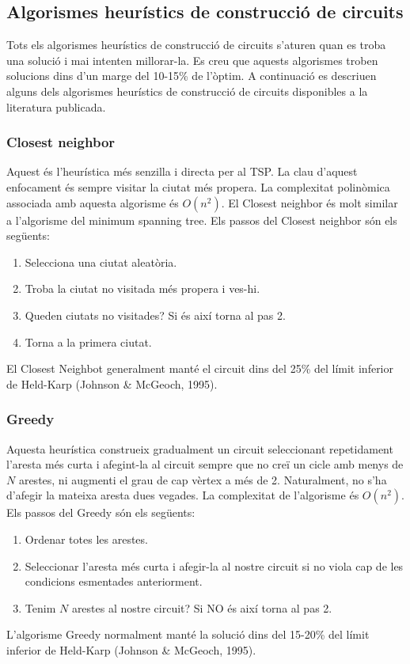 \documentclass[a4paper,12pt,twoside]{ThesisStyle}
\begin{document}
\subsection{Algorismes heurístics de construcció de circuits}
\label{AlgorismesHeuristicsConstruccio}
Tots els algorismes heurístics de construcció de circuits s'aturen quan es troba una solució i mai intenten millorar-la. Es creu que aquests algorismes troben solucions dins d'un marge del 10-15\% de l'òptim. A continuació es descriuen alguns dels algorismes heurístics de construcció de circuits disponibles a la literatura publicada.

\subsubsection{Closest neighbor}
\label{ClosestNeighbor}
Aquest és l'heurística més senzilla i directa per al TSP. La clau d'aquest enfocament és sempre visitar la ciutat més propera. La complexitat polinòmica associada amb aquesta algorisme és \( O(n^2) \). El Closest neighbor és molt similar a l'algorisme del minimum spanning tree. Els passos del Closest neighbor són els següents:
\begin{enumerate}
  \item Selecciona una ciutat aleatòria.
  \item Troba la ciutat no visitada més propera i ves-hi.
  \item Queden ciutats no visitades? Si és així torna al pas 2.
  \item Torna a la primera ciutat.
\end{enumerate}
El Closest Neighbot generalment manté el circuit dins del 25\% del límit inferior de Held-Karp (Johnson \& McGeoch, 1995).

\subsubsection{Greedy}
\label{Greedy}
Aquesta heurística construeix gradualment un circuit seleccionant repetidament l'aresta més curta i afegint-la al circuit sempre que no creï un cicle amb menys de \( N \) arestes, ni augmenti el grau de cap vèrtex a més de 2. Naturalment, no s'ha d'afegir la mateixa aresta dues vegades. La complexitat de l'algorisme és \( O(n^2) \). Els passos del Greedy són els següents:
\begin{enumerate}
  \item Ordenar totes les arestes.
  \item Seleccionar l'aresta més curta i afegir-la al nostre circuit si no viola cap de les condicions esmentades anteriorment.
  \item Tenim \( N \) arestes al nostre circuit? Si NO és així torna al pas 2.
\end{enumerate}
L'algorisme Greedy normalment manté la solució dins del 15-20\% del límit inferior de Held-Karp (Johnson \& McGeoch, 1995).
\end{document}

